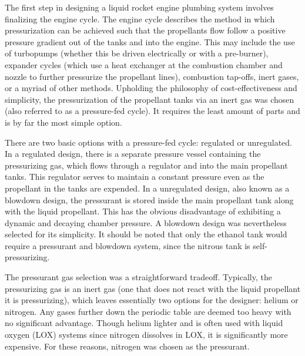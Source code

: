 \documentclass[9pt]{article} %
\numberwithin{equation}{section} %
\begin{document}
\hspace{\parindent} The first step in designing a liquid rocket engine plumbing system involves finalizing the engine cycle. The engine cycle describes the method in which pressurization can be achieved such that the propellants flow follow a positive pressure gradient out of the tanks and into the engine. This may include the use of turbopumps (whether this be driven electrically or with a pre-burner), expander cycles (which use a heat exchanger at the combustion chamber and nozzle to further pressurize the propellant lines), combustion tap-offs, inert gases, or a myriad of other methods. Upholding the philosophy of cost-effectiveness and simplicity, the pressurization of the propellant tanks via an inert gas was chosen (also referred to as a pressure-fed cycle). It requires the least amount of parts and is by far the most simple option.

There are two basic options with a pressure-fed cycle: regulated or unregulated. In a regulated design, there is a separate pressure vessel containing the pressurizing gas, which flows through a regulator and into the main propellant tanks. This regulator serves to maintain a constant pressure even as the propellant in the tanks are expended. In a unregulated design, also known as a blowdown design, the pressurant is stored inside the main propellant tank along with the liquid propellant. This has the obvious disadvantage of exhibiting a dynamic and decaying chamber pressure. A blowdown design was nevertheless selected for its simplicity. It should be noted that only the ethanol tank would require a pressurant and blowdown system, since the nitrous tank is self-pressurizing.

The pressurant gas selection was a straightforward tradeoff. Typically, the pressurizing gas is an inert gas (one that does not react with the liquid propellant it is pressurizing), which leaves essentially two options for the designer: helium or nitrogen. Any gases further down the periodic table are deemed too heavy with no significant advantage. Though helium lighter and is often used with liquid oxygen (LOX) systems since nitrogen dissolves in LOX, it is significantly more expensive. For these reasons, nitrogen was chosen as the pressurant.
\end{document}

